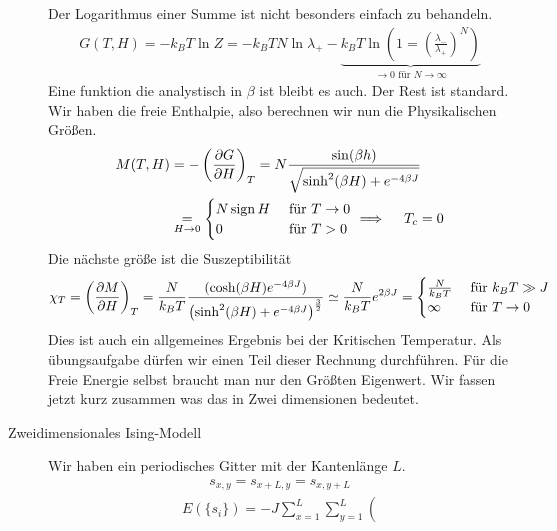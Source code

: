 \begin{description}
     Der Logarithmus einer Summe ist nicht besonders einfach zu behandeln.
     \begin{align*}
       G(T, H) = - k_B T \ln{ Z}  = - k_B T N \ln{ \lambda_+} - \underbrace{k_B T
       \ln{\left( 1 = \left( \frac{\lambda_-}{\lambda_+} \right)^N \right)}}_{\to 0 \text{ für } N \to \infty}
     \end{align*}
     Eine funktion die analystisch in $\beta $ ist bleibt es auch. Der Rest ist standard.
     Wir haben die freie Enthalpie, also berechnen wir nun die Physikalischen Größen.
     \begin{align*}
       M(T, H) & = - \left( \frac{\partial G }{\partial H} \right)_T =  N \frac{\sin(\beta h)}{\sqrt{\sinh^2(\beta H) + e^{- 4 \beta J}}} \\
               & \underset{H\to 0}{=} 
       \begin{cases}
         N \operatorname{sign} H & \text{ für } T\to 0 \\
         0 & \text{ für } T > 0 \\
       \end{cases}  \implies \quad T_c = 0
     \end{align*}
     Die nächste größe ist die Suszeptibilität
     \begin{align*}
       \chi_T = \left( \frac{\partial M }{\partial H} \right)_T = \frac{N}{k_B T}
       \frac{(\cosh(\beta H) e^{-4 \beta J})}{\left( \sinh^2 (\beta H)+ e^{-4 \beta J} \right) ^{\frac{3}{2}}}
       \simeq 
       \frac{N }{k_B T} e^{2 \beta J} = \begin{cases}
         \frac{N}{k_B T} & \text{ für } k_B T \gg J \\
         \infty & \text{ für } T\to0
       \end{cases} 
     \end{align*}
     Dies ist auch ein allgemeines Ergebnis bei der Kritischen Temperatur.
     Als übungsaufgabe dürfen wir einen Teil dieser Rechnung durchführen.
     Für die Freie Energie selbst braucht man nur den Größten Eigenwert.
     Wir fassen jetzt kurz zusammen was das in Zwei dimensionen bedeutet.
   \item[Zweidimensionales Ising-Modell]
     Wir haben ein periodisches Gitter mit der Kantenlänge $L$.
     \begin{align*}
       s_{x,y} = s_{x + L, y} = s_{x, y+L}
     \end{align*}
     \begin{align*}
       E(\{s_i\}) = - J \sum_{x=1}^{L}\sum_{y=1}^{L} \left( 

\end{align*}
\end{description}
